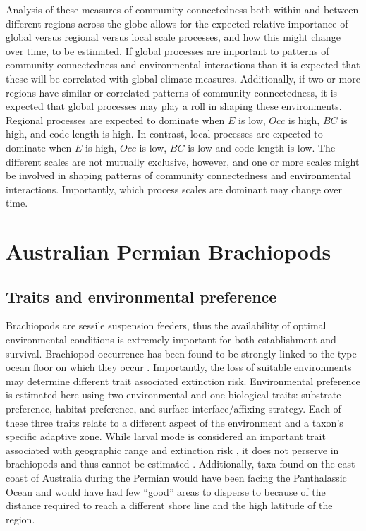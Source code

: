 \documentclass[12pt,letterpaper]{article}
\begin{document}
Analysis of these measures of community connectedness both within and between different regions across the globe allows for the expected relative importance of global versus regional versus local scale processes, and how this might change over time, to be estimated. If global processes are important to patterns of community connectedness and environmental interactions than it is expected that these will be correlated with global climate measures. Additionally, if two or more regions have similar or correlated patterns of community connectedness, it is expected that global processes may play a roll in shaping these environments. Regional processes are expected to dominate when \(E\) is low, \(Occ\) is high, \(BC\) is high, and code length is high. In contrast, local processes are expected to dominate when \(E\) is high, \(Occ\) is low, \(BC\) is low and code length is low. The different scales are not mutually exclusive, however, and one or more scales might be involved in shaping patterns of community connectedness and environmental interactions. Importantly, which process scales are dominant may change over time.

\clearpage

\section{Australian Permian Brachiopods} \label{sec:brac}

\subsection{Traits and environmental preference} \label{sec:bracback}
Brachiopods are sessile suspension feeders, thus the availability of optimal environmental conditions is extremely important for both establishment and survival. Brachiopod occurrence has been found to be strongly linked to the type ocean floor on which they occur \citep{Richardson1997,Richardson1997a}. Importantly, the loss of suitable environments may determine different trait associated extinction risk. Environmental preference is estimated here using two environmental and one biological traits: substrate preference, habitat preference, and surface interface/affixing strategy. Each of these three traits relate to a different aspect of the environment and a taxon's specific adaptive zone. While larval mode is considered an important trait associated with geographic range and extinction risk \citep{Jablonski2006a,Jablonski1983}, it does not perserve in brachiopods and thus cannot be estimated \citep{Jablonski1983}. Additionally, taxa found on the east coast of Australia during the Permian would have been facing the Panthalassic Ocean and would have had few ``good'' areas to disperse to because of the distance required to reach a different shore line and the high latitude of the region.
\end{document}
